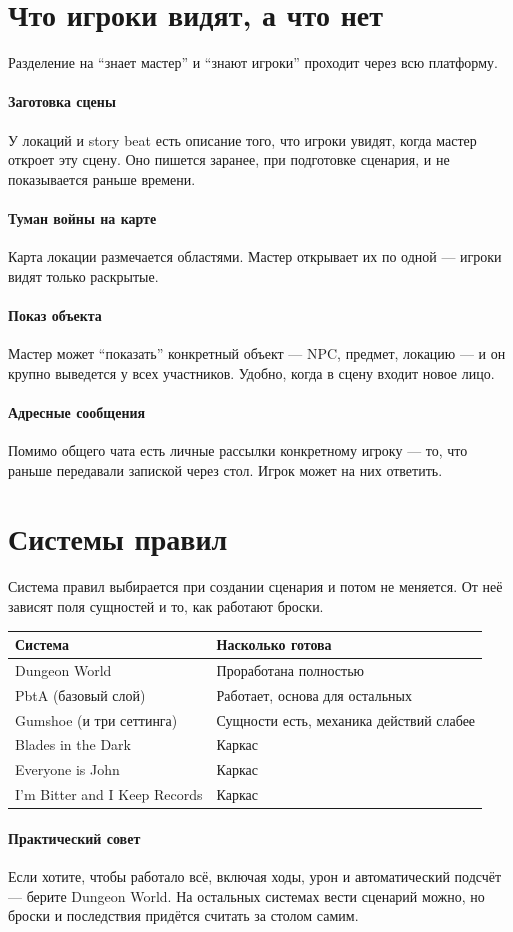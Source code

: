 \section{Что игроки видят, а что нет}
\label{sec:concepts:exposure}

Разделение на ``знает мастер'' и ``знают игроки'' проходит через всю платформу.

\paragraph{Заготовка сцены}
У локаций и story beat есть описание того, что игроки увидят, когда мастер откроет эту сцену. Оно пишется заранее, при подготовке сценария, и не показывается раньше времени.

\paragraph{Туман войны на карте}
Карта локации размечается областями. Мастер открывает их по одной --- игроки видят только раскрытые.

\paragraph{Показ объекта}
Мастер может ``показать'' конкретный объект --- NPC, предмет, локацию --- и он крупно выведется у всех участников. Удобно, когда в сцену входит новое лицо.

\paragraph{Адресные сообщения}
Помимо общего чата есть личные рассылки конкретному игроку --- то, что раньше передавали запиской через стол. Игрок может на них ответить.

\section{Системы правил}
\label{sec:concepts:rulesystems}

Система правил выбирается при создании сценария и потом не меняется. От неё зависят поля сущностей и то, как работают броски.

\begin{center}
\begin{tabular}{ll}
\textbf{Система} & \textbf{Насколько готова} \\
\hline
Dungeon World & Проработана полностью \\
PbtA (базовый слой) & Работает, основа для остальных \\
Gumshoe (и три сеттинга) & Сущности есть, механика действий слабее \\
Blades in the Dark & Каркас \\
Everyone is John & Каркас \\
I'm Bitter and I Keep Records & Каркас \\
\end{tabular}
\end{center}

\paragraph{Практический совет}
Если хотите, чтобы работало всё, включая ходы, урон и автоматический подсчёт --- берите Dungeon World. На остальных системах вести сценарий можно, но броски и последствия придётся считать за столом самим.
